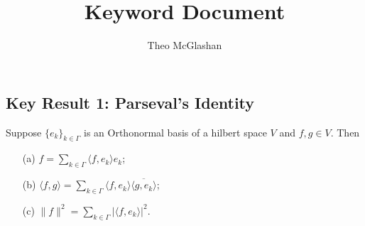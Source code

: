 \documentclass[12pt]{amsart}
\title{Keyword Document}
\author{Theo McGlashan}
\date{}
\begin{document}
\maketitle

\subsection*{Key Result 1: Parseval's Identity}

Suppose $\{e_k\}_{k \in \Gamma}$ is an Orthonormal basis of a hilbert space $V$ and $f, g \in V$. Then
\begin{itemize}
    \item [(a)] $f = \sum_{k \in \Gamma} \langle f, e_k \rangle e_k$;
    \item [(b)] $\langle f, g \rangle = \sum_{k \in \Gamma} \langle f, e_k \rangle \overline{\langle g, e_k \rangle}$;
    \item [(c)] $\|f\|^2 = \sum_{k \in \Gamma} | \langle f, e_k \rangle |^2$.
\end{itemize}
\end{document}
